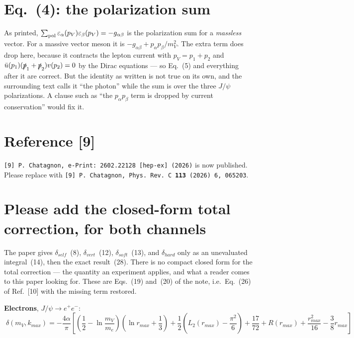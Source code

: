 \documentclass[11pt]{article}
\begin{document}
\section{Eq.~(4): the polarization sum}

As printed,
$\sum_{\rm pol}\varepsilon_\alpha(p_V)\varepsilon_\beta(p_V)=-g_{\alpha\beta}$
is the polarization sum for a \emph{massless} vector. For a massive vector meson
it is $-g_{\alpha\beta}+p_\alpha p_\beta/m_V^{2}$. The extra term does drop here,
because it contracts the lepton current with $p_V=p_1+p_2$ and
$\bar u(p_1)(\slashed p_1+\slashed p_2)v(p_2)=0$ by the Dirac equations --- so
Eq.~(5) and everything after it are correct. But the identity as written is not
true on its own, and the surrounding text calls it ``the photon'' while the sum
is over the three $J/\psi$ polarizations. A clause such as ``the
$p_\alpha p_\beta$ term is dropped by current conservation'' would fix it.

\section{Reference [9]}

\texttt{[9] P. Chatagnon, e-Print: 2602.22128 [hep-ex] (2026)} is now published.
Please replace with
\texttt{[9] P. Chatagnon, Phys. Rev. C \textbf{113} (2026) 6, 065203}.

\section{Please add the closed-form total correction, for both channels}

The paper gives $\delta_{self}$~(8), $\delta_{vert}$~(12), $\delta_{soft}$~(13),
and $\delta_{hard}$ only as an unevaluated integral~(14), then the exact
result~(28). There is no compact closed form for the total correction --- the
quantity an experiment applies, and what a reader comes to this paper looking
for. These are Eqs.~(19) and~(20) of the note, i.e.\ Eq.~(26) of Ref.~[10] with
the missing term restored.

\medskip
\textbf{Electrons}, $J/\psi\to e^+e^-$:
\begin{equation*}
\boxed{\;
\delta(m_V,k_{max})=-\frac{4\alpha}{\pi}
\left[
\left(\frac12-\ln\frac{m_V}{m_e}\right)\left(\ln r_{max}+\frac13\right)
+\frac12\left(L_2(r_{max})-\frac{\pi^{2}}{6}\right)
+\frac{17}{72}+R(r_{max})
+\frac{r_{max}^{2}}{16}-\frac{3}{8}r_{max}
\right]\;}
\end{equation*}
\end{document}

